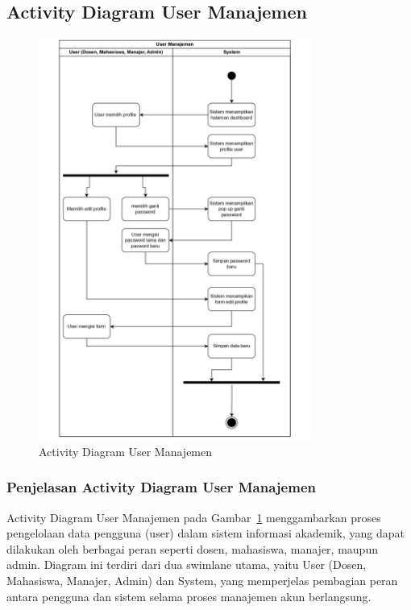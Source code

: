 \documentclass[a4paper,oneside,11pt]{book}
\begin{document}
\subsection{Activity Diagram User Manajemen}
\begin{figure}[H]
  \centering
  \includegraphics[width=0.8\textwidth]{Activity Diagram/User Manajemen.jpg}
  \caption{Activity Diagram User Manajemen}
  \label{fig:activity_user_manajemen}
\end{figure}

\subsubsection{Penjelasan Activity Diagram User Manajemen}
Activity Diagram User Manajemen pada Gambar~\ref{fig:activity_user_manajemen} menggambarkan proses pengelolaan data pengguna (user) dalam sistem informasi akademik, yang dapat dilakukan oleh berbagai peran seperti dosen, mahasiswa, manajer, maupun admin. Diagram ini terdiri dari dua swimlane utama, yaitu User (Dosen, Mahasiswa, Manajer, Admin) dan System, yang memperjelas pembagian peran antara pengguna dan sistem selama proses manajemen akun berlangsung.
\end{document}
